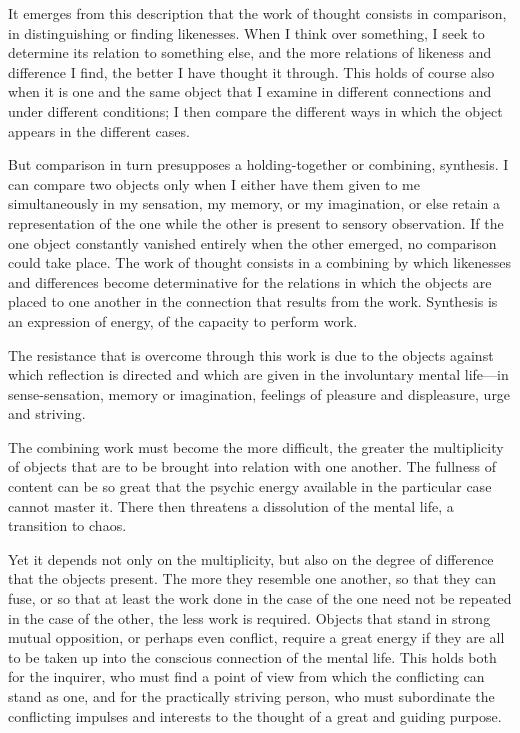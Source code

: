 \documentclass[12pt,a4paper]{book}
\newcommand{\opage}[1]{\marginnote{\footnotesize\textit{[#1]}}}
\begin{document}
It emerges from this description that the work of thought consists in
comparison, in distinguishing or finding likenesses. When I think over
something, I seek to determine its relation to something else, and the
more relations of likeness and difference I find, the better I have
thought it through. This holds of course also when it is one and the
same object that I examine in different connections and under \opage{4}different
conditions; I then compare the different ways in which the object
appears in the different cases.

But comparison in turn presupposes a holding-together or combining,
synthesis. I can compare two objects only when I either have them given
to me simultaneously in my sensation, my memory, or my imagination, or
else retain a representation of the one while the other is present to
sensory observation. If the one object constantly vanished entirely when
the other emerged, no comparison could take place. The work of thought
consists in a combining by which likenesses and differences become
determinative for the relations in which the objects are placed to one
another in the connection that results from the work. Synthesis is an
expression of energy, of the capacity to perform work.

The resistance that is overcome through this work is due to the objects
against which reflection is directed and which are given in the
involuntary mental life---in sense-sensation, memory or imagination,
feelings of pleasure and displeasure, urge and striving.

The combining work must become the more difficult, the greater the
multiplicity of objects that are to be brought into relation with one
another. The fullness of content can be so great that the psychic energy
available in the particular case cannot master it. There then threatens
a dissolution of the mental life, a transition to chaos.

Yet it depends not only on the multiplicity, but also on the degree of
difference that the objects present. The more they resemble one another,
so that they can fuse, or so that at least the work done in the case of
the one need not be repeated in the case of the other, the less work is
required. Objects that stand in strong mutual opposition, or perhaps
even conflict, require a great energy if they are all to be taken up into
the conscious connection of the mental life. This holds both for the
inquirer, who must find a point of view from which the conflicting can
stand as one, and for the practically striving person, \opage{5}who must
subordinate the conflicting impulses and interests to the thought of a
great and guiding purpose.
\end{document}
